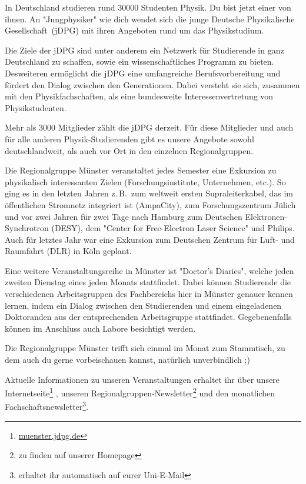 \begin{multicols}{2}
In Deutschland studieren rund \num{30000} Studenten Physik.
Du bist jetzt einer von ihnen.
An "Jungphysiker" wie dich wendet sich die junge Deutsche Physikalische Gesellschaft~(jDPG) mit ihren Angeboten rund um das Physikstudium.

Die Ziele der jDPG sind unter anderem ein Netzwerk für Studierende in ganz Deutschland zu schaffen, sowie ein wissenschaftliches Programm zu bieten.
Desweiteren ermöglicht die jDPG eine umfangreiche Berufsvorbereitung und fördert den Dialog zwischen den Generationen.
Dabei versteht sie sich, zusammen mit den Physikfachschaften, als eine bundesweite Interessenvertretung von Physikstudenten.

Mehr als \num{3000} Mitglieder zählt die jDPG derzeit.
Für diese Mitglieder und auch für alle anderen Physik-Studierenden gibt es unsere Angebote sowohl deutschlandweit, als auch vor Ort in den einzelnen Regionalgruppen.

Die Regionalgruppe Münster veranstaltet jedes Semester eine Exkursion zu physikalisch interessanten Zielen (Forschungsinstitute, Unternehmen, etc.).
So ging es in den letzten Jahren z.\,B.\ zum weltweit ersten Supraleiterkabel, das im öffentlichen Stromnetz integriert ist (AmpaCity), zum Forschungszentrum Jülich und vor zwei Jahren für zwei Tage nach Hamburg zum Deutschen Elektronen-Synchrotron (DESY), dem "Center for Free-Electron Laser Science" und Philips. Auch für letztes Jahr war eine Exkursion zum Deutschen Zentrum für Luft- und Raumfahrt (DLR) in Köln geplant.

Eine weitere Veranstaltungsreihe in Münster ist "Doctor's Diaries", welche jeden zweiten Dienstag eines jeden Monats stattfindet.
Dabei können Studierende die verschiedenen Arbeitsgruppen des Fachbereichs hier in Münster genauer kennen lernen, indem ein Dialog zwischen den Studierenden und einem eingeladenen Doktoranden aus der entsprechenden Arbeitsgruppe stattfindet. Gegebenenfalls können im Anschluss auch Labore besichtigt werden.


Die Regionalgruppe Münster trifft sich einmal im Monat zum Stammtisch, zu dem auch du gerne vorbeischauen kannst, natürlich unverbindlich ;)


Aktuelle Informationen zu unseren Veranstaltungen erhaltet ihr über unsere Internetseite\footnote{\url{muenster.jdpg.de}} , unseren Regionalgruppen-Newsletter\footnote{zu finden auf unserer Homepage} und den monatlichen Fachschaftsnewsletter\footnote{erhaltet ihr automatisch auf eurer Uni-E-Mail}.


\end{multicols}
